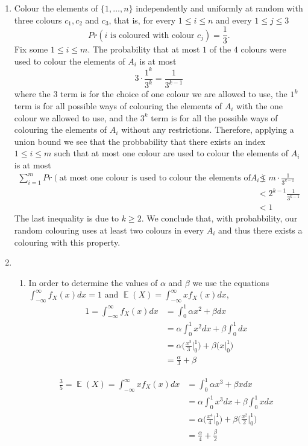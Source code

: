 \documentclass[a4paper, 11pt, oneside]{article}
\DeclareMathOperator{\EX}{\mathbb{E}}
\begin{document}
\begin{enumerate}
\item Colour the elements of $\{1,\ldots,n\}$ independently and uniformly at random with three colours $c_1,c_2$ and $c_3$, 
that is, for every $1 \leq i \leq n$ and every $1 \leq j \leq 3$
\begin{equation*}
Pr(i\text{ is coloured with colour }c_j) = \frac{1}{3}.
 \end{equation*}
Fix some $1 \leq i \leq m$. The probability that at most $1$ of the $4$ colours were used to colour the elements of $A_i$ is at most
\begin{equation*}
3 \cdot \frac{1^k}{3^k} = \frac{1}{3^{k-1}}
 \end{equation*}
 where the $3$ term is for the choice of one colour we are allowed to use, the $1^k$ term is for all possible ways of colouring the elements of $A_i$ with the one colour we allowed to use, and the $3^k$ term is for all the possible ways of colouring the elements of $A_i$ without any restrictions.
 Therefore, applying a union bound we see that the probbability that there exists an index $1 \leq i \leq m$ such that at most one colour are used to colour the elements of $A_i$ is at most
 \begin{align*}
\sum^m_{i=1}Pr(\text{at most one colour is used to colour the elements of} A_i) &\leq m \cdot\frac{1}{3^{k-1}} 
\\&< 2^{k-1} \frac{1}{3^{k-1}}  \\&< 1
 \end{align*}
The last inequality is due to $k \geq 2$. We conclude that, with probabbility, our random colouring uses at least two colours in every $A_i$ and thus there exists a colouring with this property.
\item
 \begin{enumerate}
\item  
In order to determine the values of $\alpha$ and $\beta$ we use the equations
 $\int_{-\infty}^{\infty} f_X(x) dx = 1$ and $\EX(X) = \int_{-\infty}^{\infty} x f_X(x) dx$,
 \begin{align*}\label{ff}
1 = \int_{-\infty}^{\infty} f_X(x) dx &=
\int_{0}^{1} \alpha x^2 + \beta dx  \\&=
\alpha \int_{0}^{1}  x^2 dx +  \beta \int_{0}^{1}  dx  \\&=
\alpha \Big(\frac{x^3}{3}\Bigr|^1_0\Big) + \beta \Big(x\Bigr|^1_0\Big) \\&=
 \frac{\alpha}{3} + \beta
 \end{align*}
 
 \begin{align*}
\frac{3}{5} = \EX(X) =\int_{-\infty}^{\infty} x f_X(x) dx &=
\int_{0}^{1} \alpha x^3 + \beta x dx  \\&=
\alpha \int_{0}^{1}  x^3 dx +  \beta \int_{0}^{1}  x dx  \\&=
\alpha \Big(\frac{x^4}{4}\Bigr|^1_0\Big) + \beta \Big(\frac{x^2}{2}\Bigr|^1_0\Big) \\&=
 \frac{\alpha}{4} +  \frac{\beta}{2}
 \end{align*}
 

\end{enumerate}
\end{enumerate}
\end{document}
